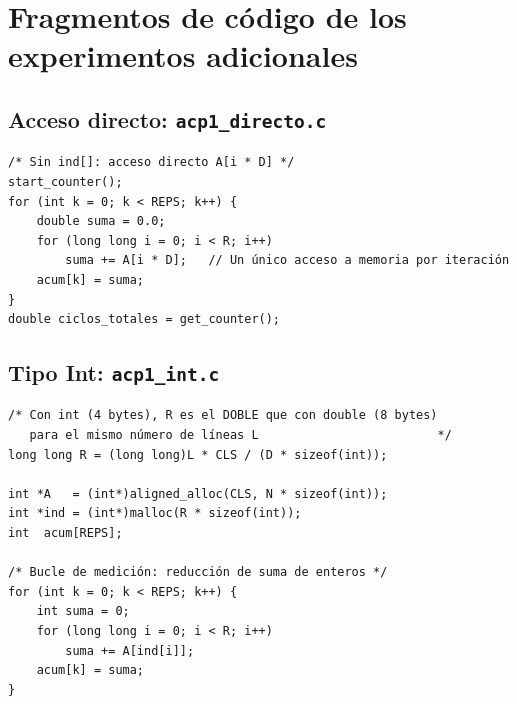 \documentclass[12pt,a4paper]{article}
\begin{document}
\appendix
\section{Fragmentos de código de los experimentos adicionales}

\subsection{Acceso directo: \texttt{acp1\_directo.c}}

\begin{lstlisting}[caption={Bucle de medición con acceso directo (sin vector de índices)}, label=lst:directo]
/* Sin ind[]: acceso directo A[i * D] */
start_counter();
for (int k = 0; k < REPS; k++) {
    double suma = 0.0;
    for (long long i = 0; i < R; i++)
        suma += A[i * D];   // Un único acceso a memoria por iteración
    acum[k] = suma;
}
double ciclos_totales = get_counter();
\end{lstlisting}

\subsection{Tipo Int: \texttt{acp1\_int.c}}

\begin{lstlisting}[caption={Diferencia clave en acp1\_int.c: tipo int y cálculo de R}, label=lst:int]
/* Con int (4 bytes), R es el DOBLE que con double (8 bytes)
   para el mismo número de líneas L                         */
long long R = (long long)L * CLS / (D * sizeof(int));

int *A   = (int*)aligned_alloc(CLS, N * sizeof(int));
int *ind = (int*)malloc(R * sizeof(int));
int  acum[REPS];

/* Bucle de medición: reducción de suma de enteros */
for (int k = 0; k < REPS; k++) {
    int suma = 0;
    for (long long i = 0; i < R; i++)
        suma += A[ind[i]];
    acum[k] = suma;
}
\end{lstlisting}
\end{document}
